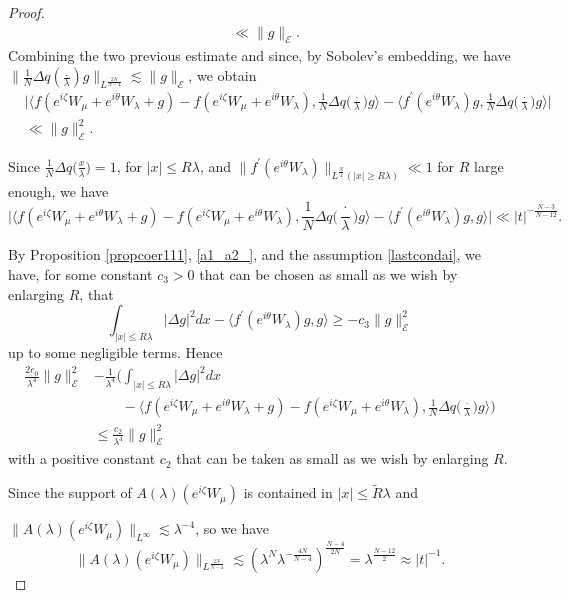 \documentclass[a4paper,two-side,10pt]{amsart}
\numberwithin{equation}{section}
\begin{document}
\begin{proof}
\begin{align*}
&\ll \|g\|_{\mathcal{E}}.
\end{align*}
Combining the two previous estimate and since, by Sobolev's embedding, we have $\|\frac{1}{N} \Delta q (\frac{.}{\lambda}) g \|_{L^{\frac{2N}{N-4}}} \lesssim \|g\|_{\mathcal{E}}$, we obtain
\begin{align*}
&\big|\big\langle f(e^{i\zeta}W_\mu +e^{i\theta} W_\lambda +g) - f(e^{i\zeta}W_\mu +e^{i\theta} W_\lambda) , \frac{1}{N}\Delta q \big(\frac{\cdot}{\lambda}\big) g  \big\rangle - \big\langle f^\prime (e^{i\theta}W_\lambda)g , \frac{1}{N}\Delta q \big(\frac{\cdot}{\lambda}\big) g \big\rangle\big|\\
& \ll %
\|g\|_{\mathcal{E}}^2 . 
\end{align*}

Since $\frac{1}{N}\Delta q \big(\frac{x}{\lambda}\big)=1$, for $|x|\leq R \lambda$, and $\|f^\prime (e^{i\theta} W_\lambda)\|_{L^{\frac{N}{4}} (|x|\geq R\lambda)} \ll 1$ for $R$ large enough, we have
$$\big|\big\langle f(e^{i\zeta}W_\mu +e^{i\theta} W_\lambda +g) - f(e^{i\zeta}W_\mu +e^{i\theta} W_\lambda) , \frac{1}{N}\Delta q \big(\frac{\cdot}{\lambda}\big) g  \big\rangle - \langle f^\prime (e^{i\theta}W_\lambda)g ,  g \rangle\big| \ll  |t|^{-\frac{N-3}{N-12}}.$$

By Proposition \ref{propcoer111}, \eqref{a1_a2_}, and the assumption \eqref{lastcondai}, we have, for some constant $c_3>0$ that can be chosen as small as we wish by enlarging $R$, that
$$\int_{|x|\leq R\lambda} |\Delta g|^2 dx - \langle f^\prime (e^{i\theta } W_\lambda) g ,g\rangle \geq - c_3 \|g\|_{\mathcal{E}}^2 $$
 up to some negligible terms.
Hence
\begin{align*}
\frac{2c_0}{\lambda^4} \|g\|_{\mathcal{E}}^2 & - \frac{1}{\lambda^4} \Big(\int_{|x|\leq R\lambda} |\Delta g|^2 dx \\
&\qquad -\big\langle f (e^{i\zeta}W_\mu +e^{i\theta} W_\lambda +g) - f (e^{i\zeta} W_\mu +e^{i\theta} W_\lambda ) , \frac{1}{N} \Delta q \big(\frac{\cdot}{\lambda} \big) g\big\rangle  \Big) \\
& \leq \frac{c_2}{\lambda^4} \|g\|_{\mathcal{E}}^2
\end{align*}
with a positive constant $c_2$ that can be taken as small as we wish by enlarging $R$.

Since the support of $A(\lambda)(e^{i\zeta} W_\mu)$ is contained in $|x|\leq \tilde{R} \lambda$ and 

$\|A(\lambda)(e^{i\zeta} W_\mu)\|_{L^\infty}\lesssim \lambda^{-4}$, so we have
$$\|A(\lambda)(e^{i\zeta} W_\mu)\|_{L^{\frac{2N}{N-4}}} \lesssim (\lambda^N \lambda^{-\frac{4N}{N-4} } )^{\frac{N-4}{2N}}=\lambda^{\frac{N-12}{2}}\approx |t|^{-1}.  $$


\end{proof}
\end{document}
